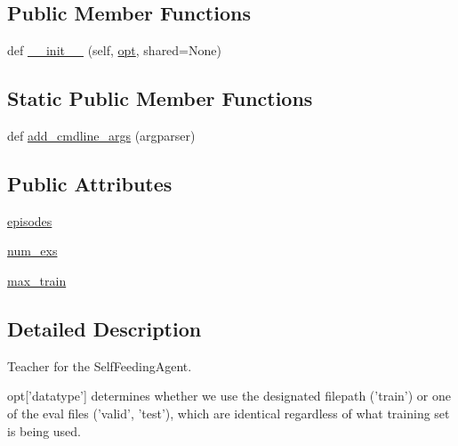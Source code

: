 \subsection*{Public Member Functions}
\begin{DoxyCompactItemize}
\item 
def \hyperlink{classparlai_1_1tasks_1_1self__feeding_1_1agents_1_1SelfFeedingTeacher_ab0ab36e04c55553c03a77c049ae72a43}{\+\_\+\+\_\+init\+\_\+\+\_\+} (self, \hyperlink{classparlai_1_1core_1_1agents_1_1Teacher_a3ce6243860ce978a897922863ed32fa4}{opt}, shared=None)
\end{DoxyCompactItemize}
\subsection*{Static Public Member Functions}
\begin{DoxyCompactItemize}
\item 
def \hyperlink{classparlai_1_1tasks_1_1self__feeding_1_1agents_1_1SelfFeedingTeacher_a07b3ffdd16baf2b93be5e87e11f6745c}{add\+\_\+cmdline\+\_\+args} (argparser)
\end{DoxyCompactItemize}
\subsection*{Public Attributes}
\begin{DoxyCompactItemize}
\item 
\hyperlink{classparlai_1_1tasks_1_1self__feeding_1_1agents_1_1SelfFeedingTeacher_a63dea9aaa22e209cc87ef89a58e1b47f}{episodes}
\item 
\hyperlink{classparlai_1_1tasks_1_1self__feeding_1_1agents_1_1SelfFeedingTeacher_a6f2bcfa23af24a60b672b9ec368c09ff}{num\+\_\+exs}
\item 
\hyperlink{classparlai_1_1tasks_1_1self__feeding_1_1agents_1_1SelfFeedingTeacher_ad3868ed012b1209fa330702147ed85b9}{max\+\_\+train}
\end{DoxyCompactItemize}


\subsection{Detailed Description}
\begin{DoxyVerb}Teacher for the SelfFeedingAgent.

opt['datatype'] determines whether we use the designated filepath ('train') or one
of the eval files ('valid', 'test'), which are identical regardless of     what
training set is being used.
\end{DoxyVerb}
 

